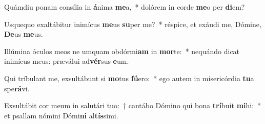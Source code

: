 \item Quámdiu ponam consília in \textbf{á}nima \textbf{me}a,~* dolórem in corde \textbf{me}o per \textbf{di}em?
\item Usquequo exaltábitur inimícus \textbf{me}us \textbf{su}per me?~* réspice, et exáudi me, Dómine, \textbf{De}us \textbf{me}us.
\item Illúmina óculos meos ne umquam obdórmi\textbf{am} in \textbf{mor}te:~* nequándo dicat inimícus meus: præválui ad\textbf{vér}sus \textbf{e}um.
\item Qui tríbulant me, exsultábunt si \textbf{mo}tus \textbf{fú}ero:~* ego autem in misericórdia \textbf{tu}a spe\textbf{rá}vi.
\item Exsultábit cor meum in salutári tuo:~† cantábo Dómino qui bona \textbf{trí}buit \textbf{mi}hi:~* et psallam nómini Dómi\textbf{ni} al\textbf{tís}simi.
